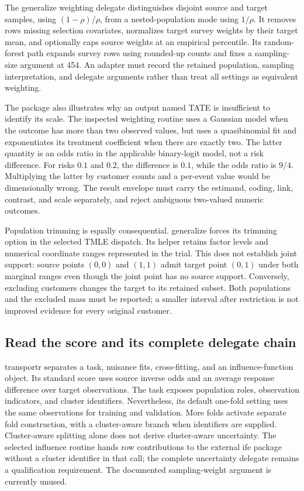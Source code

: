 The generalize weighting delegate distinguishes disjoint source and target samples, using $(1-\rho)/\rho$, from a nested-population mode using $1/\rho$. It removes rows missing selection covariates, normalizes target survey weights by their target mean, and optionally caps source weights at an empirical percentile. Its random-forest path expands survey rows using rounded-up counts and fixes a sampling-size argument at 454. An adapter must record the retained population, sampling interpretation, and delegate arguments rather than treat all settings as equivalent weighting.\citep{exec25_rtm_generalize}

The package also illustrates why an output named TATE is insufficient to identify its scale. The inspected weighting routine uses a Gaussian model when the outcome has more than two observed values, but uses a quasibinomial fit and exponentiates its treatment coefficient when there are exactly two. The latter quantity is an odds ratio in the applicable binary-logit model, not a risk difference. For risks $0.1$ and $0.2$, the difference is $0.1$, while the odds ratio is $9/4$. Multiplying the latter by customer counts and a per-event value would be dimensionally wrong. The result envelope must carry the estimand, coding, link, contrast, and scale separately, and reject ambiguous two-valued numeric outcomes.\citep{exec25_rtm_generalize,exec25_rtm_choice}

Population trimming is equally consequential. generalize forces its trimming option in the selected TMLE dispatch. Its helper retains factor levels and numerical coordinate ranges represented in the trial. This does not establish joint support: source points $(0,0)$ and $(1,1)$ admit target point $(0,1)$ under both marginal ranges even though the joint point has no source support. Conversely, excluding customers changes the target to its retained subset. Both populations and the excluded mass must be reported; a smaller interval after restriction is not improved evidence for every original customer.\citep{exec25_rtm_generalize,exec25_rtm_choice}

\subsection{Read the score and its complete delegate chain}

transportr separates a task, nuisance fits, cross-fitting, and an influence-function object. Its standard score uses source inverse odds and an average response difference over target observations. The task exposes population roles, observation indicators, and cluster identifiers. Nevertheless, its default one-fold setting uses the same observations for training and validation. More folds activate separate fold construction, with a cluster-aware branch when identifiers are supplied. Cluster-aware splitting alone does not derive cluster-aware uncertainty. The selected influence routine hands row contributions to the external ife package without a cluster identifier in that call; the complete uncertainty delegate remains a qualification requirement. The documented sampling-weight argument is currently unused.\citep{exec25_rtm_transportr}

